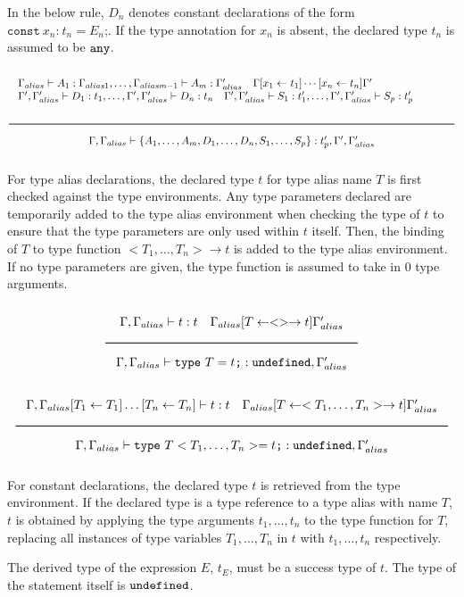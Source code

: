 In the below rule, $D_n$ denotes constant declarations of the form $\texttt{const}\ x_n \texttt{:}\ t_n = E_n\texttt{;}$.
If the type annotation for $x_n$ is absent, the declared type $t_n$ is assumed to be $\texttt{any}$.

\[
  \Rule{\begin{minipage}{140mm}
    $\Gamma_{alias} \vdash A_1 : \Gamma_{alias1}, \ldots, \Gamma_{aliasm-1} \vdash A_m : \Gamma'_{alias} \quad
    \Gamma [x_1 \leftarrow t_1] \cdots [x_n \leftarrow t_n] \Gamma'$ \\
    $\Gamma', \Gamma'_{alias} \vdash D_1 : t_1, \ldots, \Gamma', \Gamma'_{alias} \vdash D_n : t_n \quad
    \Gamma', \Gamma'_{alias} \vdash S_1 : t'_1, \ldots, \Gamma', \Gamma'_{alias} \vdash S_p : t'_p$\\
    \end{minipage}}{
    \Gamma, \Gamma_{alias} \vdash \{ A_1, \ldots, A_m, D_1, \ldots, D_n, S_1, \ldots, S_p \} : t'_p, \Gamma', \Gamma'_{alias}}
\]

For type alias declarations, the declared type $t$ for type alias name $T$ is first checked against the type environments.
Any type parameters declared are temporarily added to the type alias environment when checking the type of $t$
to ensure that the type parameters are only used within $t$ itself.
Then, the binding of $T$ to type function $<T_1, \ldots, T_n> \rightarrow t$ is added to the type alias environment.
If no type parameters are given, the type function is assumed to take in 0 type arguments.

\noindent
\[
  \Rule{\Gamma, \Gamma_{alias} \vdash t : t \quad \Gamma_{alias} [T \leftarrow <> \rightarrow t] \Gamma'_{alias}
    }{\Gamma, \Gamma_{alias} \vdash \texttt{type}\ T = t \texttt{;} : \Undefined, \Gamma'_{alias}}
\]
\noindent
\[
  \Rule{\Gamma, \Gamma_{alias}[T_1 \leftarrow T_1]\ldots[T_n \leftarrow T_n] \vdash t : t \quad
    \Gamma_{alias} [T \leftarrow <T_1, \ldots, T_n> \rightarrow t] \Gamma'_{alias}
    }{\Gamma, \Gamma_{alias} \vdash \texttt{type}\ T<T_1, \ldots, T_n> = t \texttt{;} : \Undefined, \Gamma'_{alias}}
\]
\noindent

For constant declarations, the declared type $t$ is retrieved from the type environment.
If the declared type is a type reference to a type alias with name $T$,
$t$ is obtained by applying the type arguments $t_1, \ldots, t_n$ to the type function for $T$,
replacing all instances of type variables $T_1, \ldots, T_n$ in $t$ with $t_1, \ldots, t_n$ respectively.

The derived type of the expression $E$, $t_E$, must be a success type of $t$.
The type of the statement itself is $\texttt{undefined}$.

